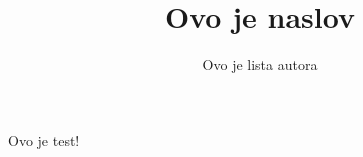 \documentclass{article}
\title{Ovo je naslov}
\author{Ovo je lista autora}
\begin{document}
\maketitle
Ovo je test!
\end{document}
